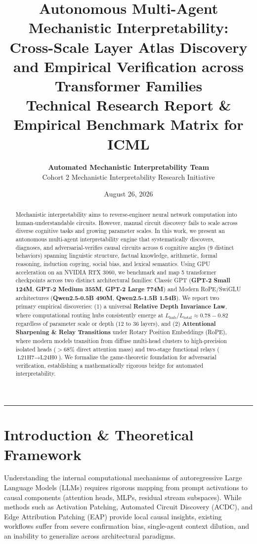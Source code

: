 \documentclass[10pt,a4paper]{article}
\title{\textbf{\Large Autonomous Multi-Agent Mechanistic Interpretability: \\
\large Cross-Scale Layer Atlas Discovery and Empirical Verification across Transformer Families}\\[0.4em]
\normalsize \textbf{Technical Research Report \& Empirical Benchmark Matrix for ICML}}
\author{\textbf{Automated Mechanistic Interpretability Team} \\
Cohort 2 Mechanistic Interpretability Research Initiative}
\date{August 26, 2026}
\begin{document}
\maketitle

\begin{abstract}
Mechanistic interpretability aims to reverse-engineer neural network computation into human-understandable circuits. However, manual circuit discovery fails to scale across diverse cognitive tasks and growing parameter scales. In this work, we present an autonomous multi-agent interpretability engine that systematically discovers, diagnoses, and adversarial-verifies causal circuits across 6 cognitive angles (9 distinct behaviors) spanning linguistic structure, factual knowledge, arithmetic, formal reasoning, induction copying, social bias, and lexical semantics. Using GPU acceleration on an NVIDIA RTX 3060, we benchmark and map 5 transformer checkpoints across two distinct architectural families: Classic GPT (\textbf{GPT-2 Small 124M}, \textbf{GPT-2 Medium 355M}, \textbf{GPT-2 Large 774M}) and Modern RoPE/SwiGLU architectures (\textbf{Qwen2.5-0.5B 490M}, \textbf{Qwen2.5-1.5B 1.54B}). 
We report two primary empirical discoveries: (1) a universal \textbf{Relative Depth Invariance Law}, where computational routing hubs consistently emerge at $L_{\text{hub}}/L_{\text{total}} \approx 0.78 - 0.82$ regardless of parameter scale or depth ($12$ to $36$ layers), and (2) \textbf{Attentional Sharpening \& Relay Transitions} under Rotary Position Embeddings (RoPE), where modern models transition from diffuse multi-head clusters to high-precision isolated heads ($>68\%$ direct attention mass) and two-stage functional relays ($\text{L21H7} \rightarrow \text{L24H0}$). We formalize the game-theoretic foundation for adversarial verification, establishing a mathematically rigorous bridge for automated interpretability.
\end{abstract}

\vspace{0.6em}
\hrule
\vspace{0.8em}

\section{Introduction \& Theoretical Framework}

Understanding the internal computational mechanisms of autoregressive Large Language Models (LLMs) requires rigorous mapping from prompt activations to causal components (attention heads, MLPs, residual stream subspaces). While methods such as Activation Patching, Automated Circuit Discovery (ACDC), and Edge Attribution Patching (EAP) provide local causal insights, existing workflows suffer from severe confirmation bias, single-agent context dilution, and an inability to generalize across architectural paradigms.
\end{document}
